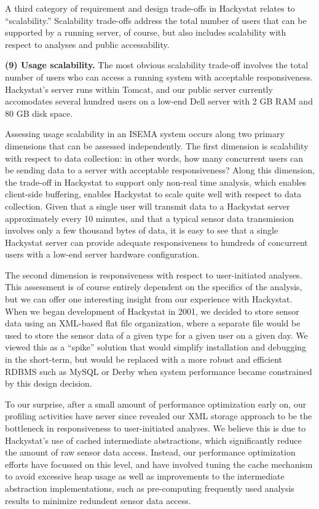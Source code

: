 \documentclass[10pt,twocolumn]{article}
\begin{document}

A third category of requirement and design trade-offs in Hackystat relates
to ``scalability.''  Scalability trade-offs address the total number of
users that can be supported by a running server, of course, but also
includes scalability with respect to analyses and public accessability.

{\bf (9) Usage scalability.}  The most obvious scalability trade-off involves
the total number of users who can access a running system with acceptable
responsiveness.  Hackystat's server runs within Tomcat, and our public
server currently accomodates several hundred users on a low-end Dell server
with 2 GB RAM and 80 GB disk space. 

Assessing usage scalability in an ISEMA system occurs along two primary
dimensions that can be assessed independently.  The first dimension is
scalability with respect to data collection: in other words, how many
concurrent users can be sending data to a server with acceptable
responsiveness?  Along this dimension, the trade-off in Hackystat to
support only non-real time analysis, which enables client-side buffering,
enables Hackystat to scale quite well with respect to data
collection. Given that a single user will transmit data to a Hackystat
server approximately every 10 minutes, and that a typical sensor data
transmission involves only a few thousand bytes of data, it is easy to see
that a single Hackystat server can provide adequate responsiveness to
hundreds of concurrent users with a low-end server hardware configuration.

The second dimension is responsiveness with respect to user-initiated
analyses.  This assessment is of course entirely dependent on the specifics
of the analysis, but we can offer one interesting insight from our
experience with Hackystat. When we began development of Hackystat in 2001,
we decided to store sensor data using an XML-based flat file organization,
where a separate file would be used to store the sensor data of a given
type for a given user on a given day. We viewed this as a ``spike''
solution that would simplify installation and debugging in the short-term,
but would be replaced with a more robust and efficient RDBMS such as MySQL
or Derby when system performance became constrained by this design
decision.

To our surprise, after a small amount of performance optimization early on,
our profiling activities have never since revealed our XML storage approach
to be the bottleneck in responsiveness to user-initiated analyses.  We
believe this is due to Hackystat's use of cached intermediate abstractions,
which significantly reduce the amount of raw sensor data access.  Instead,
our performance optimization efforts have focussed on this level, and have
involved tuning the cache mechanism to avoid excessive heap usage as well
as improvements to the intermediate abstraction implementations, such as
pre-computing frequently used analysis results to minimize redundent sensor
data access.
\end{document}
